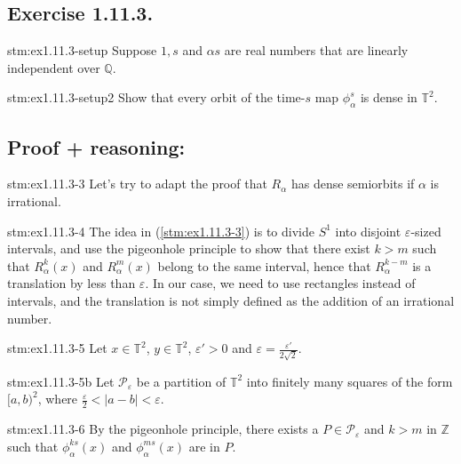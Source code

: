 \subsection*{Exercise 1.11.3.}

\begin{exercise}{stm:ex1.11.3-setup}
Suppose $1, s$ and $\alpha s$ are real numbers that are linearly independent over $\mathbb{Q}$.
\end{exercise}

\begin{exercise}{stm:ex1.11.3-setup2}
Show that every orbit of the time-$s$ map $\phi_\alpha^s$ is dense in $\mathbb{T}^2$.
\end{exercise}

\subsection*{Proof {\color{blue}+ reasoning}:}

\begin{explanation}{stm:ex1.11.3-3}
Let's try to adapt the proof that $R_\alpha$ has dense semiorbits if $\alpha$ is irrational.
\end{explanation}

\begin{explanation}{stm:ex1.11.3-4}
The idea in (\ref{stm:ex1.11.3-3}) is to divide $S^1$ into disjoint $\varepsilon$-sized intervals, and use the pigeonhole principle to show that there exist $k > m$ such that $R_\alpha^k(x)$ and $R_\alpha^m(x)$ belong to the same interval, hence that $R_\alpha^{k-m}$ is a translation by less than $\varepsilon$. In our case, we need to use rectangles instead of intervals, and the translation is not simply defined as the addition of an irrational number.
\end{explanation}

\begin{statement}{stm:ex1.11.3-5}
Let $x \in \mathbb{T}^2$, $y \in \mathbb{T}^2$, $\varepsilon' > 0$ and $\varepsilon = \frac{\varepsilon'}{2\sqrt{2}}$. 
\end{statement}

\begin{statement}{stm:ex1.11.3-5b}
Let $\mathcal{P}_\varepsilon$ be a partition of $\mathbb{T}^2$ into finitely many squares of the form $[a,b)^2$, where $\frac{\varepsilon}{2} < |a-b| < \varepsilon$.
\end{statement}

\begin{statement}{stm:ex1.11.3-6}
By the pigeonhole principle, there exists a $P \in \mathcal{P}_\varepsilon$ and $k > m$ in $\mathbb{Z}$ such that $\phi_\alpha^{ks}(x)$ and $\phi_\alpha^{ms}(x)$ are in $P$.
\end{statement}

